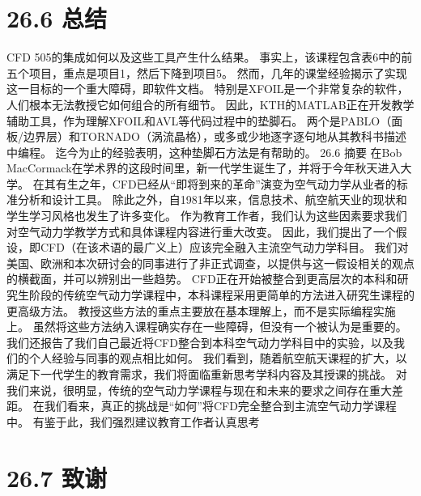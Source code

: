 \documentclass[UTF8,11pt,a4paper,openany,fontset=fandol]{ctexbook}
\begin{document}
\section{26.6 总结}
CFD 505的集成如何以及这些工具产生什么结果。 事实上，该课程包含表6中的前五个项目，重点是项目1，然后下降到项目5。 然而，几年的课堂经验揭示了实现这一目标的一个重大障碍，即软件文档。 特别是XFOIL是一个非常复杂的软件，人们根本无法教授它如何组合的所有细节。 因此，KTH的MATLAB正在开发教学辅助工具，作为理解XFOIL和AVL等代码过程中的垫脚石。 两个是PABLO（面板/边界层）和TORNADO（涡流晶格），或多或少地逐字逐句地从其教科书描述中编程。 迄今为止的经验表明，这种垫脚石方法是有帮助的。 26.6 摘要 在Bob MacCormack在学术界的这段时间里，新一代学生诞生了，并将于今年秋天进入大学。 在其有生之年，CFD已经从“即将到来的革命”演变为空气动力学从业者的标准分析和设计工具。 除此之外，自1981年以来，信息技术、航空航天业的现状和学生学习风格也发生了许多变化。 作为教育工作者，我们认为这些因素要求我们对空气动力学教学方式和具体课程内容进行重大改变。 因此，我们提出了一个假设，即CFD（在该术语的最广义上）应该完全融入主流空气动力学科目。 我们对美国、欧洲和本次研讨会的同事进行了非正式调查，以提供与这一假设相关的观点的横截面，并可以辨别出一些趋势。 CFD正在开始被整合到更高层次的本科和研究生阶段的传统空气动力学课程中，本科课程采用更简单的方法进入研究生课程的更高级方法。 教授这些方法的重点主要放在基本理解上，而不是实际编程实施上。 虽然将这些方法纳入课程确实存在一些障碍，但没有一个被认为是重要的。 我们还报告了我们自己最近将CFD整合到本科空气动力学科目中的实验，以及我们的个人经验与同事的观点相比如何。 我们看到，随着航空航天课程的扩大，以满足下一代学生的教育需求，我们将面临重新思考学科内容及其授课的挑战。 对我们来说，很明显，传统的空气动力学课程与现在和未来的要求之间存在重大差距。 在我们看来，真正的挑战是“如何”将CFD完全整合到主流空气动力学课程中。 有鉴于此，我们强烈建议教育工作者认真思考

\section{26.7 致谢}
\end{document}
